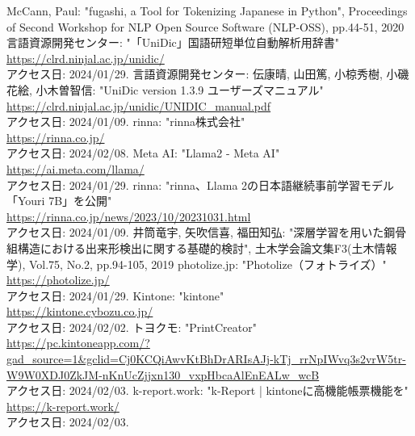\documentclass[uplatex, report, a4j, 10pt]{jsbook}
\begin{document}
\begin{thebibliography}{0}
  McCann, Paul: "fugashi, a Tool for Tokenizing Japanese in Python", Proceedings of Second Workshop for NLP Open Source Software (NLP-OSS), pp.44-51, 2020
  言語資源開発センター: "「UniDic」国語研短単位自動解析用辞書"\\\url{https://clrd.ninjal.ac.jp/unidic/}\\アクセス日: 2024/01/29.
  言語資源開発センター: 伝康晴, 山田篤, 小椋秀樹, 小磯花絵, 小木曽智信: "UniDic version 1.3.9 ユーザーズマニュアル"\\\url{https://clrd.ninjal.ac.jp/unidic/UNIDIC_manual.pdf}\\アクセス日: 2024/01/09.
  rinna: "rinna株式会社"\\\url{https://rinna.co.jp/}\\アクセス日: 2024/02/08.
  Meta AI: "Llama2 - Meta AI"\\\url{https://ai.meta.com/llama/}\\アクセス日: 2024/01/29.
  rinna: "rinna、Llama 2の日本語継続事前学習モデル「Youri 7B」を公開"\\\url{https://rinna.co.jp/news/2023/10/20231031.html}\\アクセス日: 2024/01/09.
  井筒竜宇, 矢吹信喜, 福田知弘: "深層学習を用いた鋼骨組構造における出来形検出に関する基礎的検討", 土木学会論文集F3(土木情報学), Vol.75, No.2, pp.94-105, 2019
  photolize.jp: "Photolize（フォトライズ）"\\\url{https://photolize.jp/}\\アクセス日: 2024/01/29.
  Kintone: "kintone"\\\url{https://kintone.cybozu.co.jp/}\\アクセス日: 2024/02/02.
  トヨクモ: "PrintCreator"\\\url{https://pc.kintoneapp.com/?gad_source=1&gclid=Cj0KCQiAwvKtBhDrARIsAJj-kTj_rrNpIWvq3s2vrW5tr-W9W0XDJ0ZkJM-nKnUcZjjxn130_vxpHbcaAlEnEALw_wcB}\\アクセス日: 2024/02/03.
  k-report.work: "k-Report | kintoneに高機能帳票機能を"\\\url{https://k-report.work/}\\アクセス日: 2024/02/03.
\end{thebibliography}

\end{document}
